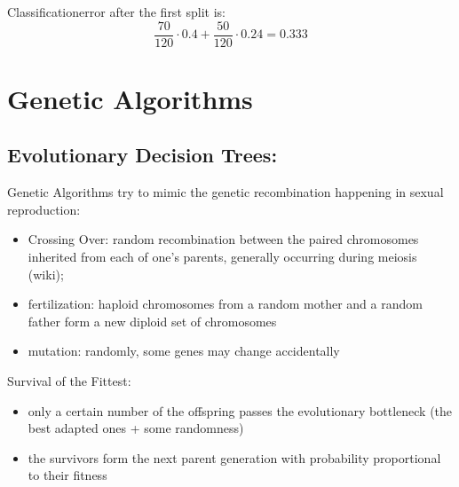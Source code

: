 \documentclass[letterpaper,10pt,english]{jupyterBook}
\begin{document}
\sphinxAtStartPar
Classification\sphinxhyphen{}error after the first split is:
\label{equation:Tree_Methods:2153ebbd-f4ca-4668-9d4b-d6dde9099e74}\begin{equation}
\frac{70}{120} \cdot 0.4 + \frac{50}{120} \cdot 0.24 = \mathbf{0.333}
\end{equation}



\chapter{Genetic Algorithms}
\label{\detokenize{Tree_Methods:genetic-algorithms}}
\sphinxAtStartPar
{}

\noindent{}

\sphinxAtStartPar
{}


\section{Evolutionary Decision Trees:}
\label{\detokenize{Tree_Methods:evolutionary-decision-trees}}
\sphinxAtStartPar
Genetic Algorithms try to mimic the genetic recombination happening in sexual reproduction:
\begin{itemize}
\item {} 
\sphinxAtStartPar
Crossing Over: random recombination between the paired chromosomes inherited from each of one’s parents, generally occurring during meiosis (wiki);

\item {} 
\sphinxAtStartPar
fertilization: haploid chromosomes from a random mother and a random father form a new diploid set of chromosomes

\item {} 
\sphinxAtStartPar
mutation: randomly, some genes may change accidentally

\end{itemize}

\sphinxAtStartPar
Survival of the Fittest:
\begin{itemize}
\item {} 
\sphinxAtStartPar
only a certain number of the offspring passes the evolutionary bottleneck (the best adapted ones + some randomness)

\item {} 
\sphinxAtStartPar
the survivors form the next parent generation with probability proportional to their fitness

\end{itemize}
\end{document}
